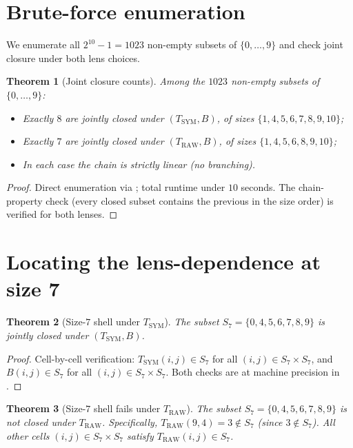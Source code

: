 \documentclass[11pt,reqno]{amsart}
\newtheorem{theorem}{Theorem}[section]
\theoremstyle{definition}
\newcommand{\TRAW}{T_{\mathrm{RAW}}}
\newcommand{\TSYM}{T_{\mathrm{SYM}}}
\newcommand{\BHML}{B}
\begin{document}
\section{Brute-force enumeration}
\label{sec:enumeration}

We enumerate all $2^{10} - 1 = 1023$ non-empty subsets of
$\{0, \ldots, 9\}$ and check joint closure under both lens choices.

\begin{theorem}[Joint closure counts]
\label{thm:enumeration}
Among the $1023$ non-empty subsets of $\{0, \ldots, 9\}$:
\begin{itemize}[leftmargin=*]
\item Exactly $8$ are jointly closed under $(\TSYM, \BHML)$, of
  sizes $\{1, 4, 5, 6, 7, 8, 9, 10\}$;
\item Exactly $7$ are jointly closed under $(\TRAW, \BHML)$, of
  sizes $\{1, 4, 5, 6, 8, 9, 10\}$;
\item In each case the chain is strictly linear (no branching).
\end{itemize}
\end{theorem}

\begin{proof}
Direct enumeration via \cite{Gen13WP115}; total runtime under
$10$ seconds. The chain-property check (every closed subset
contains the previous in the size order) is verified for both
lenses.
\end{proof}

\section{Locating the lens-dependence at size 7}
\label{sec:size7}

\begin{theorem}[Size-$7$ shell under $\TSYM$]
\label{thm:size7-sym}
The subset $S_7 = \{0, 4, 5, 6, 7, 8, 9\}$ is jointly closed under
$(\TSYM, \BHML)$.
\end{theorem}

\begin{proof}
Cell-by-cell verification: $\TSYM(i, j) \in S_7$ for all
$(i, j) \in S_7 \times S_7$, and $\BHML(i, j) \in S_7$ for all
$(i, j) \in S_7 \times S_7$. Both checks are at machine precision
in \cite{Gen13WP115}.
\end{proof}

\begin{theorem}[Size-$7$ shell fails under $\TRAW$]
\label{thm:size7-raw}
The subset $S_7 = \{0, 4, 5, 6, 7, 8, 9\}$ is \emph{not} closed
under $\TRAW$. Specifically, $\TRAW(9, 4) = 3 \notin S_7$ (since
$3 \notin S_7$). All other cells $(i, j) \in S_7 \times S_7$
satisfy $\TRAW(i, j) \in S_7$.
\end{theorem}
\end{document}
